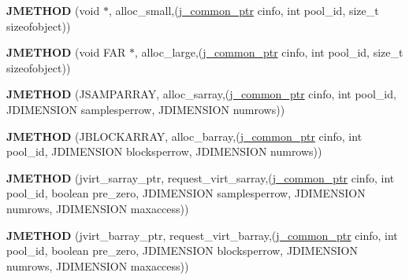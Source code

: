 \begin{DoxyCompactItemize}
\item 
\hypertarget{structjpeg__memory__mgr_a9372ad24444dda23175cc9203105911c}{{\bfseries J\-M\-E\-T\-H\-O\-D} (void $\ast$, alloc\-\_\-small,(\hyperlink{structjpeg__common__struct}{j\-\_\-common\-\_\-ptr} cinfo, int pool\-\_\-id, size\-\_\-t sizeofobject))}\label{structjpeg__memory__mgr_a9372ad24444dda23175cc9203105911c}

\item 
\hypertarget{structjpeg__memory__mgr_a130f6dbc700cc045bdbe35beff2cb326}{{\bfseries J\-M\-E\-T\-H\-O\-D} (void F\-A\-R $\ast$, alloc\-\_\-large,(\hyperlink{structjpeg__common__struct}{j\-\_\-common\-\_\-ptr} cinfo, int pool\-\_\-id, size\-\_\-t sizeofobject))}\label{structjpeg__memory__mgr_a130f6dbc700cc045bdbe35beff2cb326}

\item 
\hypertarget{structjpeg__memory__mgr_a3fdd2e1dfdc089fd61f17b608c0263f2}{{\bfseries J\-M\-E\-T\-H\-O\-D} (J\-S\-A\-M\-P\-A\-R\-R\-A\-Y, alloc\-\_\-sarray,(\hyperlink{structjpeg__common__struct}{j\-\_\-common\-\_\-ptr} cinfo, int pool\-\_\-id, J\-D\-I\-M\-E\-N\-S\-I\-O\-N samplesperrow, J\-D\-I\-M\-E\-N\-S\-I\-O\-N numrows))}\label{structjpeg__memory__mgr_a3fdd2e1dfdc089fd61f17b608c0263f2}

\item 
\hypertarget{structjpeg__memory__mgr_aefc8abe884dab5648c1e4e7ada2e2e18}{{\bfseries J\-M\-E\-T\-H\-O\-D} (J\-B\-L\-O\-C\-K\-A\-R\-R\-A\-Y, alloc\-\_\-barray,(\hyperlink{structjpeg__common__struct}{j\-\_\-common\-\_\-ptr} cinfo, int pool\-\_\-id, J\-D\-I\-M\-E\-N\-S\-I\-O\-N blocksperrow, J\-D\-I\-M\-E\-N\-S\-I\-O\-N numrows))}\label{structjpeg__memory__mgr_aefc8abe884dab5648c1e4e7ada2e2e18}

\item 
\hypertarget{structjpeg__memory__mgr_a34b830d9d7b2f4fd043e98421a700503}{{\bfseries J\-M\-E\-T\-H\-O\-D} (jvirt\-\_\-sarray\-\_\-ptr, request\-\_\-virt\-\_\-sarray,(\hyperlink{structjpeg__common__struct}{j\-\_\-common\-\_\-ptr} cinfo, int pool\-\_\-id, boolean pre\-\_\-zero, J\-D\-I\-M\-E\-N\-S\-I\-O\-N samplesperrow, J\-D\-I\-M\-E\-N\-S\-I\-O\-N numrows, J\-D\-I\-M\-E\-N\-S\-I\-O\-N maxaccess))}\label{structjpeg__memory__mgr_a34b830d9d7b2f4fd043e98421a700503}

\item 
\hypertarget{structjpeg__memory__mgr_aee93326ad6a64714443e90044614d2a6}{{\bfseries J\-M\-E\-T\-H\-O\-D} (jvirt\-\_\-barray\-\_\-ptr, request\-\_\-virt\-\_\-barray,(\hyperlink{structjpeg__common__struct}{j\-\_\-common\-\_\-ptr} cinfo, int pool\-\_\-id, boolean pre\-\_\-zero, J\-D\-I\-M\-E\-N\-S\-I\-O\-N blocksperrow, J\-D\-I\-M\-E\-N\-S\-I\-O\-N numrows, J\-D\-I\-M\-E\-N\-S\-I\-O\-N maxaccess))}\label{structjpeg__memory__mgr_aee93326ad6a64714443e90044614d2a6}


\end{DoxyCompactItemize}
